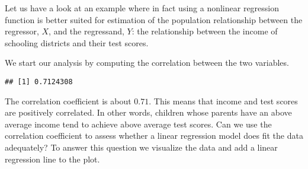 \documentclass[]{book}
\newenvironment{Shaded}{\begin{snugshade}}{\end{snugshade}}
\newcommand{\KeywordTok}[1]{\textcolor[rgb]{0.13,0.29,0.53}{\textbf{#1}}}
\newcommand{\DecValTok}[1]{\textcolor[rgb]{0.00,0.00,0.81}{#1}}
\newcommand{\StringTok}[1]{\textcolor[rgb]{0.31,0.60,0.02}{#1}}
\newcommand{\CommentTok}[1]{\textcolor[rgb]{0.56,0.35,0.01}{\textit{#1}}}
\newcommand{\OperatorTok}[1]{\textcolor[rgb]{0.81,0.36,0.00}{\textbf{#1}}}
\newcommand{\NormalTok}[1]{#1}
\theoremstyle{definition}
\theoremstyle{definition}
\theoremstyle{definition}
\theoremstyle{remark}
\begin{document}
Let us have a look at an example where in fact using a nonlinear
regression function is better suited for estimation of the population
relationship between the regressor, \(X\), and the regressand, \(Y\):
the relationship between the income of schooling districts and their
test scores.

\begin{Shaded}
\end{Shaded}

We start our analysis by computing the correlation between the two
variables.

\begin{Shaded}
\end{Shaded}

\begin{verbatim}
## [1] 0.7124308
\end{verbatim}

The correlation coefficient is about \(0.71\). This means that income
and test scores are positively correlated. In other words, children
whose parents have an above average income tend to achieve above average
test scores. Can we use the correlation coefficient to assess whether a
linear regression model does fit the data adequately? To answer this
question we visualize the data and add a linear regression line to the
plot.
\end{document}
